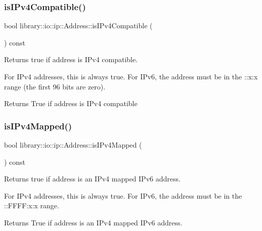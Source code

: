 \subsubsection{\texorpdfstring{is\+I\+Pv4\+Compatible()}{isIPv4Compatible()}}
{\footnotesize\ttfamily bool library\+::io\+::ip\+::\+Address\+::is\+I\+Pv4\+Compatible (\begin{DoxyParamCaption}{ }\end{DoxyParamCaption}) const}



Returns true if address is I\+Pv4 compatible. 

For I\+Pv4 addresses, this is always true. For I\+Pv6, the address must be in the \+::x\+:x range (the first 96 bits are zero).

\begin{DoxyReturn}{Returns}
True if address is I\+Pv4 compatible 
\end{DoxyReturn}
\mbox{\label{classlibrary_1_1io_1_1ip_1_1_address_ae995e64ad459196faf3b0b1e2379eb38}} 
\subsubsection{\texorpdfstring{is\+I\+Pv4\+Mapped()}{isIPv4Mapped()}}
{\footnotesize\ttfamily bool library\+::io\+::ip\+::\+Address\+::is\+I\+Pv4\+Mapped (\begin{DoxyParamCaption}{ }\end{DoxyParamCaption}) const}



Returns true if address is an I\+Pv4 mapped I\+Pv6 address. 

For I\+Pv4 addresses, this is always true. For I\+Pv6, the address must be in the \+::\+F\+F\+F\+F\+:x\+:x range.

\begin{DoxyReturn}{Returns}
True if address is an I\+Pv4 mapped I\+Pv6 address. 
\end{DoxyReturn}
\mbox{\label{classlibrary_1_1io_1_1ip_1_1_address_a871a9947ce8e5e84a8e3e26e80f7ddec}} 

